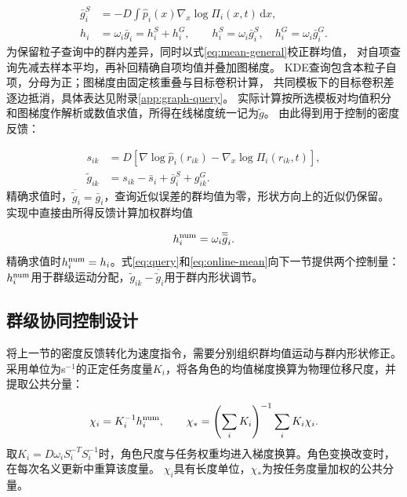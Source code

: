 \documentclass[UTF8,a4paper,11pt,fontset=none]{ctexart}
\begin{document}
\begin{equation}
\begin{aligned}
\bar g_i^S&=-D\int\widehat p_i(x)\nabla_x\log\Pi_i(x,t)\,\mathrm dx,\\
h_i&=\omega_i\bar g_i=h_i^S+h_i^G,\qquad
h_i^S=\omega_i\bar g_i^S,\quad h_i^G=\omega_i\bar g_i^G.
\end{aligned}
\label{eq:mean-general}
\end{equation}
为保留粒子查询中的群内差异，同时以式\eqref{eq:mean-general}校正群均值，
对自项查询先减去样本平均，再补回精确自项均值并叠加图梯度。
KDE查询包含本粒子自项，分母为正；图梯度由固定核重叠与目标卷积计算，
共同模板下的目标卷积差逐边抵消，具体表达见附录\ref{app:graph-query}。
实际计算按所选模板对均值积分和图梯度作解析或数值求值，所得在线梯度统一记为$\widetilde g$。
由此得到用于控制的密度反馈：

\begin{equation}
\begin{aligned}
s_{ik}&=D[\nabla\log\widehat p_i(r_{ik})-\nabla_x\log\Pi_i(r_{ik},t)],\\
\widetilde g_{ik}&=s_{ik}-\bar s_i+\bar g_i^S+g^G_{ik}.
\end{aligned}
\label{eq:query}
\end{equation}
精确求值时，$\overline{\widetilde g}_i=\bar g_i$，查询近似误差的群均值为零，形状方向上的近似仍保留。
实现中直接由所得反馈计算加权群均值

\begin{equation}
h_i^{\rm num}=\omega_i\overline{\widetilde g}_i .
\label{eq:online-mean}
\end{equation}
精确求值时$h_i^{\rm num}=h_i$。式\eqref{eq:query}和\eqref{eq:online-mean}向下一节提供两个控制量：
$h_i^{\rm num}$用于群级运动分配，$\widetilde g_{ik}-\overline{\widetilde g}_i$用于群内形状调节。

\subsection{群级协同控制设计}\label{sec:velocity-law}
将上一节的密度反馈转化为速度指令，需要分别组织群均值运动与群内形状修正。
采用单位为s$^{-1}$的正定任务度量$K_i$，将各角色的均值梯度换算为物理位移尺度，并提取公共分量：

\begin{equation}
\chi_i=K_i^{-1}h_i^{\rm num},\qquad
\chi_*=\left(\sum_iK_i\right)^{-1}\sum_iK_i\chi_i .
\label{eq:displacement}
\end{equation}
取$K_i=D\omega_iS_i^{-T}S_i^{-1}$时，角色尺度与任务权重均进入梯度换算。角色变换改变时，在每次名义更新中重算该度量。
$\chi_i$具有长度单位，$\chi_*$为按任务度量加权的公共分量。
\end{document}
